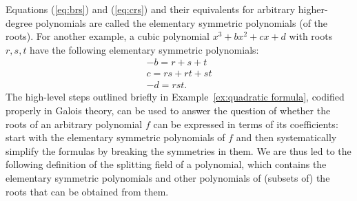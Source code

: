 \documentclass[../main.tex]{subfiles}
\begin{document}
Equations (\ref{eq:brs}) and (\ref{eq:crs}) and their equivalents for arbitrary higher-degree polynomials are called the elementary symmetric polynomials (of the roots).
For another example, a cubic polynomial $x^3 + bx^2 + cx + d$ with roots $r,s,t$ have the following elementary symmetric polynomials:
\begin{gather*}
-b = r + s + t \\
    c = rs + rt + st \\
    -d = rst.    
\end{gather*}
The high-level steps outlined briefly in Example~\ref{ex:quadratic formula}, codified properly in Galois theory, can be used to answer the question of whether the roots of an arbitrary polynomial $f$ can be expressed in terms of its coefficients: start with the elementary symmetric polynomials of $f$ and then systematically simplify the formulas by breaking the symmetries in them.
We are thus led to the following definition of the splitting field of a polynomial, which contains the elementary symmetric polynomials and other polynomials of (subsets of) the roots that can be obtained from them.

\end{document}
